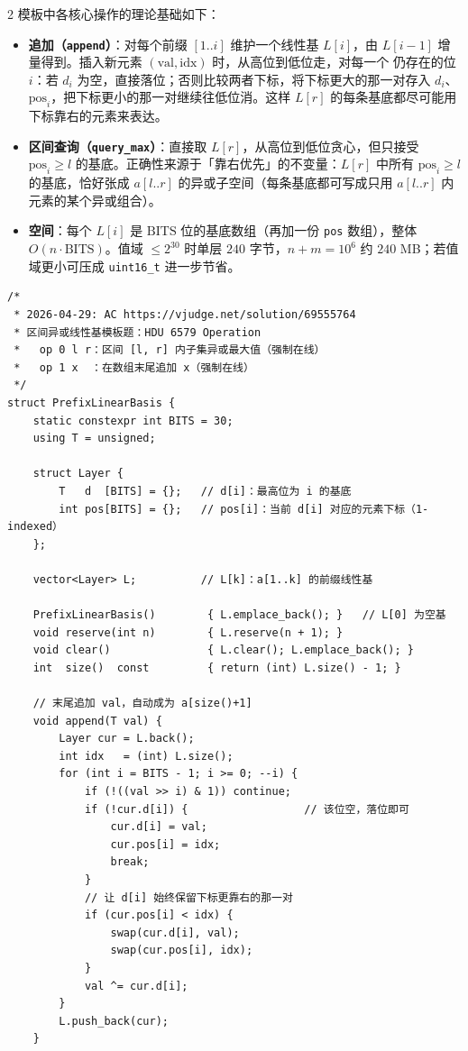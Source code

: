 \begin{multicols*}{2}
		模板中各核心操作的理论基础如下：
		\begin{itemize}
			\item \textbf{追加（\texttt{append}）}：对每个前缀 $[1..i]$ 维护一个线性基 $L[i]$，由 $L[i-1]$ 增量得到。插入新元素 $(\text{val}, \text{idx})$ 时，从高位到低位走，对每一个  仍存在的位 $i$：若 $d_i$ 为空，直接落位；否则比较两者下标，将下标更大的那一对存入 $d_i$、$\text{pos}_i$，把下标更小的那一对继续往低位消。这样 $L[r]$ 的每条基底都尽可能用下标靠右的元素来表达。
			\item \textbf{区间查询（\texttt{query\_max}）}：直接取 $L[r]$，从高位到低位贪心，但只接受 $\text{pos}_i \ge l$ 的基底。正确性来源于「靠右优先」的不变量：$L[r]$ 中所有 $\text{pos}_i \ge l$ 的基底，恰好张成 $a[l..r]$ 的异或子空间（每条基底都可写成只用 $a[l..r]$ 内元素的某个异或组合）。
			\item \textbf{空间}：每个 $L[i]$ 是 $\text{BITS}$ 位的基底数组（再加一份 \texttt{pos} 数组），整体 $O(n \cdot \text{BITS})$。值域 $\le 2^{30}$ 时单层 $240$ 字节，$n + m = 10^6$ 约 $240$ MB；若值域更小可压成 \texttt{uint16\_t} 进一步节省。
		\end{itemize}

		\begin{verbatim}
/*
 * 2026-04-29: AC https://vjudge.net/solution/69555764
 * 区间异或线性基模板题：HDU 6579 Operation
 *   op 0 l r：区间 [l, r] 内子集异或最大值（强制在线）
 *   op 1 x  ：在数组末尾追加 x（强制在线）
 */
struct PrefixLinearBasis {
	static constexpr int BITS = 30;
	using T = unsigned;

	struct Layer {
		T   d  [BITS] = {};   // d[i]：最高位为 i 的基底
		int pos[BITS] = {};   // pos[i]：当前 d[i] 对应的元素下标（1-indexed）
	};

	vector<Layer> L;          // L[k]：a[1..k] 的前缀线性基

	PrefixLinearBasis()        { L.emplace_back(); }   // L[0] 为空基
	void reserve(int n)        { L.reserve(n + 1); }
	void clear()               { L.clear(); L.emplace_back(); }
	int  size()  const         { return (int) L.size() - 1; }

	// 末尾追加 val，自动成为 a[size()+1]
	void append(T val) {
		Layer cur = L.back();
		int idx   = (int) L.size();
		for (int i = BITS - 1; i >= 0; --i) {
			if (!((val >> i) & 1)) continue;
			if (!cur.d[i]) {                  // 该位空，落位即可
				cur.d[i] = val;
				cur.pos[i] = idx;
				break;
			}
			// 让 d[i] 始终保留下标更靠右的那一对
			if (cur.pos[i] < idx) {
				swap(cur.d[i], val);
				swap(cur.pos[i], idx);
			}
			val ^= cur.d[i];
		}
		L.push_back(cur);
	}


\end{verbatim}
\end{multicols*}
